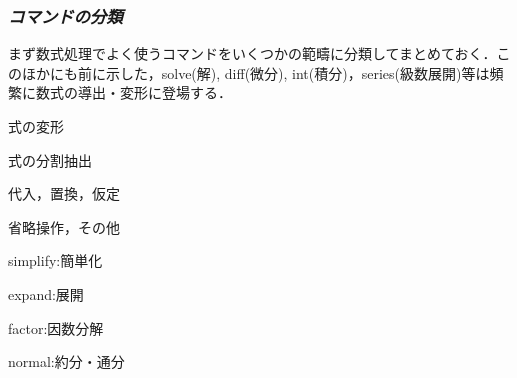 \documentclass{article}
\begin{document}
\subsubsection{\textbf{\textit{コマンドの分類}}}
\begin{maplegroup}
\begin{Maple Normal}{
まず数式処理でよく使うコマンドをいくつかの範疇に分類してまとめておく．このほかにも前に示した，solve(解), diff(微分), int(積分)，series(級数展開)等は頻繁に数式の導出・変形に登場する．}\end{Maple Normal}

\end{maplegroup}
\begin{maplelatex}\begin{Maple Normal}{
式の変形}\end{Maple Normal}
\end{maplelatex}
\begin{maplelatex}\begin{Maple Normal}{
式の分割抽出}\end{Maple Normal}
\end{maplelatex}
\begin{maplelatex}\begin{Maple Normal}{
代入，置換，仮定}\end{Maple Normal}
\end{maplelatex}
\begin{maplelatex}\begin{Maple Normal}{
省略操作，その他}\end{Maple Normal}
\end{maplelatex}
\begin{maplelatex}\begin{Maple Normal}{
simplify:簡単化}\end{Maple Normal}
\end{maplelatex}
\begin{maplelatex}\begin{Maple Normal}{
expand:展開}\end{Maple Normal}
\end{maplelatex}
\begin{maplelatex}\begin{Maple Normal}{
factor:因数分解}\end{Maple Normal}
\end{maplelatex}
\begin{maplelatex}\begin{Maple Normal}{
normal:約分・通分}\end{Maple Normal}
\end{maplelatex}
\end{document}
